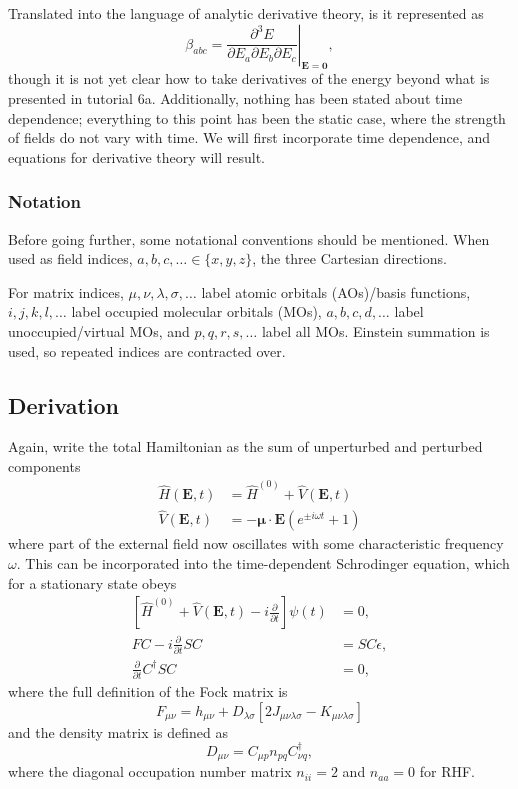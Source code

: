 Translated into the language of analytic derivative theory, is it represented as
\begin{equation}
  \beta_{abc} = \left.\frac{\partial^{3} E}{\partial E_a \partial E_b \partial E_c}\right|_{\mathbf{E}=\mathbf{0}},
\end{equation}
though it is not yet clear how to take derivatives of the energy beyond what is presented in tutorial 6a. Additionally, nothing has been stated about time dependence; everything to this point has been the static case, where the strength of fields do not vary with time. We will first incorporate time dependence, and equations for derivative theory will result.

\hypertarget{notation}{%
  \subsubsection{Notation}\label{notation}}

Before going further, some notational conventions should be mentioned.  When used as field indices, \(a,b,c,\dots \in \{x,y,z\}\), the three Cartesian directions.

For matrix indices, \(\mu,\nu,\lambda,\sigma,\dots\) label atomic orbitals (AOs)/basis functions, \(i,j,k,l,\dots\) label occupied molecular orbitals (MOs), \(a,b,c,d,\dots\) label unoccupied/virtual MOs, and \(p,q,r,s,\dots\) label all MOs. Einstein summation is used, so repeated indices are contracted over.

\hypertarget{derivation}{%
  \subsection{Derivation}\label{derivation}}

Again, write the total Hamiltonian as the sum of unperturbed and perturbed components
\begin{align}
  \hat{H}(\mathbf{E},t) &= \hat{H}^{(0)} + \hat{V}(\mathbf{E},t) \\
  \hat{V}(\mathbf{E},t) &= -\mathbf{\mu} \cdot \mathbf{E}(e^{\pm i \omega t} + 1)
\end{align}
where part of the external field now oscillates with some characteristic frequency \(\omega\). This can be incorporated into the time-dependent Schrodinger equation, which for a stationary state obeys
\begin{align}
  \left[ \hat{H}^{(0)} + \hat{V}(\mathbf{E},t) - i\frac{\partial}{\partial t} \right] \psi(t) &= 0, \\
  FC - i \frac{\partial}{\partial t} SC &= SC\epsilon, \\
  \frac{\partial}{\partial t} C^{\dagger} S C &= 0,
\end{align}
where the full definition of the Fock matrix is
\[
  F_{\mu\nu} = h_{\mu\nu} + D_{\lambda\sigma}[2J_{\mu\nu\lambda\sigma} - K_{\mu\nu\lambda\sigma}]
\]
and the density matrix is defined as
\[
  D_{\mu\nu} = C_{\mu p}n_{pq}C_{\nu q}^{\dagger},
\]
where the diagonal occupation number matrix \(n_{ii} = 2\) and \(n_{aa} = 0\) for RHF.

